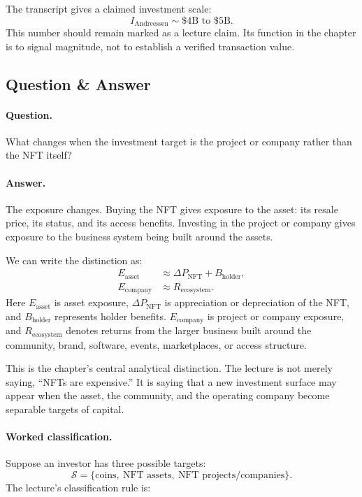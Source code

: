 The transcript gives a claimed investment scale:
\begin{equation}
I_{\mathrm{Andreessen}} \sim \$4\mathrm{B} \text{ to } \$5\mathrm{B}.
\end{equation}
This number should remain marked as a lecture claim. Its function in the chapter is to signal magnitude, not to establish a verified transaction value.

\subsection{Question \& Answer}

\paragraph{Question.}
What changes when the investment target is the project or company rather than the NFT itself?

\paragraph{Answer.}
The exposure changes. Buying the NFT gives exposure to the asset: its resale price, its status, and its access benefits. Investing in the project or company gives exposure to the business system being built around the assets.

We can write the distinction as:
\begin{align}
E_{\mathrm{asset}}
&\approx
\Delta P_{\mathrm{NFT}} + B_{\mathrm{holder}}, \\
E_{\mathrm{company}}
&\approx
R_{\mathrm{ecosystem}}.
\end{align}
Here \(E_{\mathrm{asset}}\) is asset exposure, \(\Delta P_{\mathrm{NFT}}\) is appreciation or depreciation of the NFT, and \(B_{\mathrm{holder}}\) represents holder benefits. \(E_{\mathrm{company}}\) is project or company exposure, and \(R_{\mathrm{ecosystem}}\) denotes returns from the larger business built around the community, brand, software, events, marketplaces, or access structure.

This is the chapter's central analytical distinction. The lecture is not merely saying, ``NFTs are expensive.'' It is saying that a new investment surface may appear when the asset, the community, and the operating company become separable targets of capital.

\paragraph{Worked classification.}
Suppose an investor has three possible targets:
\begin{equation}
\mathcal{S}
=
\{\text{coins},\ \text{NFT assets},\ \text{NFT projects/companies}\}.
\end{equation}
The lecture's classification rule is:

